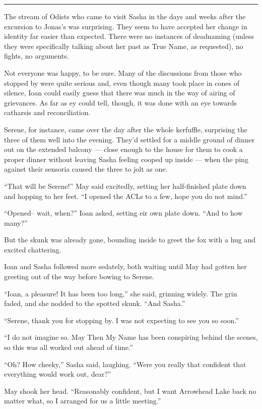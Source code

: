 \begin{center}\rule{0.5\linewidth}{0.5pt}\end{center}

The stream of Odists who came to visit Sasha in the days and weeks after the excursion to Jonas's was surprising. They seem to have accepted her change in identity far easier than expected. There were no instances of deadnaming (unless they were specifically talking about her past as True Name, as requested), no fights, no arguments.

Not everyone was happy, to be sure. Many of the discussions from those who stopped by were quite serious and, even though many took place in cones of silence, Ioan could easily guess that there was much in the way of airing of grievances. As far as ey could tell, though, it was done with an eye towards catharsis and reconciliation.

Serene, for instance, came over the day after the whole kerfuffle, surprising the three of them well into the evening. They'd settled for a middle ground of dinner out on the extended balcony — close enough to the house for them to cook a proper dinner without leaving Sasha feeling cooped up inside — when the ping against their sensoria caused the three to jolt as one.

``That will be Serene!'' May said excitedly, setting her half-finished plate down and hopping to her feet. ``I opened the ACLs to a few, hope you do not mind.''

``Opened-- wait, when?'' Ioan asked, setting eir own plate down. ``And to how many?''

But the skunk was already gone, bounding inside to greet the fox with a hug and excited chattering.

Ioan and Sasha followed more sedately, both waiting until May had gotten her greeting out of the way before bowing to Serene.

``Ioan, a pleasure! It has been too long,'' she said, grinning widely. The grin faded, and she nodded to the spotted skunk. ``And Sasha.''

``Serene, thank you for stopping by. I was not expecting to see you so soon.''

``I do not imagine so. May Then My Name has been conspiring behind the scenes, so this was all worked out ahead of time.''

``Oh? How cheeky,'' Sasha said, laughing. ``Were you really that confident that everything would work out, dear?''

May shook her head. ``Reasonably confident, but I want Arrowhead Lake back no matter what, so I arranged for us a little meeting.''

